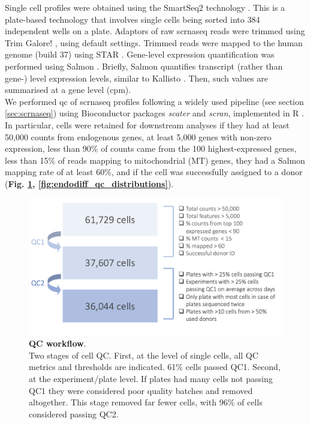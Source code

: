 Single cell profiles were obtained using the SmartSeq2 technology \cite{picelli2013smart}. 
This is a plate-based technology that involves single cells being sorted into 384 independent wells on a plate. 
Adaptors of raw \gls{scrnaseq} reads were trimmed using Trim Galore! \cite{galore2015wrapper, martin2011cutadapt, andrews2010fastqc}, using default settings. 
Trimmed reads were mapped to the human genome (build 37) using STAR \cite{dobin2013star}. 
Gene-level expression quantification was performed using Salmon \cite{patro2017salmon}. 
Briefly, Salmon quantifies transcript (rather than gene-) level expression levels, similar to Kallisto \cite{bray2016near}.
Then, such values are summarised at a gene level (\gls{cpm}).\\


We performed \gls{qc} of \gls{scrnaseq} profiles following a widely used pipeline (see section \ref{sec:scrnaseq}) using Bioconductor packages \textit{scater} and \textit{scran}, implemented in R \cite{lun2016step, mccarthy2017scater, lun2019singlecellexperiment}.  
In particular, cells were retained for downstream analyses if they had at least 50,000 counts from endogenous genes, at least 5,000 genes with non-zero expression, less than 90\% of counts came from the 100 highest-expressed genes, less than 15\% of reads mapping to mitochondrial (MT) genes, they had a Salmon mapping rate of at least 60\%, and if the cell was successfully assigned to a donor (\textbf{Fig. \ref{fig:endodiff_qc_workflow}, \ref{fig:endodiff_qc_distributions}}). 

\begin{figure}[h]
\centering
\includegraphics[width=16cm]{Chapter4/Fig/endodiff_qc_workflow.png}
\caption[QC workflow]{\textbf{QC workflow}.\\
Two stages of cell QC.
First, at the level of single cells, all QC metrics and thresholds are indicated.
61\% cells passed QC1.
Second, at the experiment/plate level.
If plates had many cells not passing QC1 they were considered poor quality batches and removed altogether.
This stage removed far fewer cells, with 96\% of cells considered passing QC2.}
\label{fig:endodiff_qc_workflow}
\end{figure}

